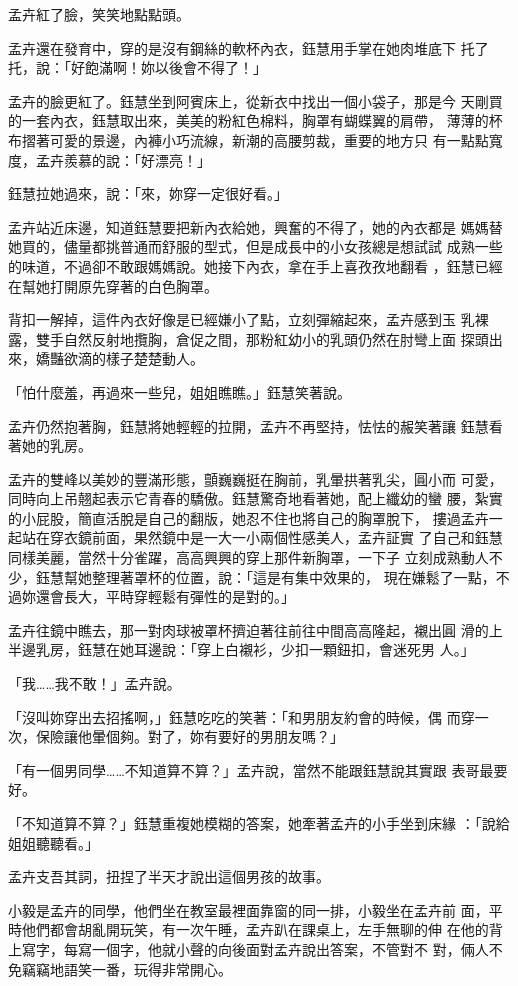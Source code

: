孟卉紅了臉，笑笑地點點頭。

孟卉還在發育中，穿的是沒有鋼絲的軟杯內衣，鈺慧用手掌在她肉堆底下
托了托，說：「好飽滿啊！妳以後會不得了！」

孟卉的臉更紅了。鈺慧坐到阿賓床上，從新衣中找出一個小袋子，那是今
天剛買的一套內衣，鈺慧取出來，美美的粉紅色棉料，胸罩有蝴蝶翼的肩帶，
薄薄的杯布摺著可愛的景邊，內褲小巧流線，新潮的高腰剪裁，重要的地方只
有一點點寬度，孟卉羨慕的說：「好漂亮！」

鈺慧拉她過來，說：「來，妳穿一定很好看。」

孟卉站近床邊，知道鈺慧要把新內衣給她，興奮的不得了，她的內衣都是
媽媽替她買的，儘量都挑普通而舒服的型式，但是成長中的小女孩總是想試試
成熟一些的味道，不過卻不敢跟媽媽說。她接下內衣，拿在手上喜孜孜地翻看
，鈺慧已經在幫她打開原先穿著的白色胸罩。

背扣一解掉，這件內衣好像是已經嫌小了點，立刻彈縮起來，孟卉感到玉
乳裸露，雙手自然反射地攬胸，倉促之間，那粉紅幼小的乳頭仍然在肘彎上面
探頭出來，嬌豔欲滴的樣子楚楚動人。

「怕什麼羞，再過來一些兒，姐姐瞧瞧。」鈺慧笑著說。

孟卉仍然抱著胸，鈺慧將她輕輕的拉開，孟卉不再堅持，怯怯的赧笑著讓
鈺慧看著她的乳房。

孟卉的雙峰以美妙的豐滿形態，顫巍巍挺在胸前，乳暈拱著乳尖，圓小而
可愛，同時向上吊翹起表示它青春的驕傲。鈺慧驚奇地看著她，配上纖幼的蠻
腰，紮實的小屁股，簡直活脫是自己的翻版，她忍不住也將自己的胸罩脫下，
摟過孟卉一起站在穿衣鏡前面，果然鏡中是一大一小兩個性感美人，孟卉証實
了自己和鈺慧同樣美麗，當然十分雀躍，高高興興的穿上那件新胸罩，一下子
立刻成熟動人不少，鈺慧幫她整理著罩杯的位置，說：「這是有集中效果的，
現在嫌鬆了一點，不過妳還會長大，平時穿輕鬆有彈性的是對的。」

孟卉往鏡中瞧去，那一對肉球被罩杯擠迫著往前往中間高高隆起，襯出圓
滑的上半邊乳房，鈺慧在她耳邊說：「穿上白襯衫，少扣一顆鈕扣，會迷死男
人。」

「我……我不敢！」孟卉說。

「沒叫妳穿出去招搖啊，」鈺慧吃吃的笑著：「和男朋友約會的時候，偶
而穿一次，保險讓他暈個夠。對了，妳有要好的男朋友嗎？」

「有一個男同學……不知道算不算？」孟卉說，當然不能跟鈺慧說其實跟
表哥最要好。

「不知道算不算？」鈺慧重複她模糊的答案，她牽著孟卉的小手坐到床緣
：「說給姐姐聽聽看。」

孟卉支吾其詞，扭捏了半天才說出這個男孩的故事。

小毅是孟卉的同學，他們坐在教室最裡面靠窗的同一排，小毅坐在孟卉前
面，平時他們都會胡亂開玩笑，有一次午睡，孟卉趴在課桌上，左手無聊的伸
在他的背上寫字，每寫一個字，他就小聲的向後面對孟卉說出答案，不管對不
對，倆人不免竊竊地語笑一番，玩得非常開心。

